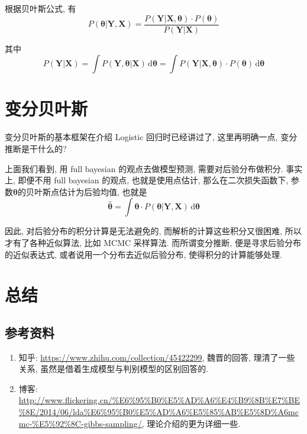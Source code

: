 \documentclass[a4paper,UTF8]{ctexart}
\theoremstyle{plain} \newtheorem{theorem}{定理}[section]
\theoremstyle{plain} \newtheorem{definition}{定义}[section]
\theoremstyle{plain} \newtheorem{lemma}{引理}[section]
\theoremstyle{plain} \newtheorem{proposition}{命题}[section]
\theoremstyle{plain} \newtheorem{example}{例}[section]
\theoremstyle{plain} \newtheorem{remark}{注}[section]
\theoremstyle{plain} \newtheorem{corollary}{推论}[section]
\newcommand\diff{\,{\mathrm d}} %
\begin{document}
根据贝叶斯公式, 有
\begin{equation}
P(\bm{\theta} | \bm{Y}, \bm{X}) = \frac{P(\bm{Y} | \bm{X}, \bm{\theta}) \cdot P(\bm{\theta})}{P(\bm{Y} | \bm{X})}
\end{equation}

 其中
 \begin{equation}
 P(\bm{Y} | \bm{X}) = \int P(\bm{Y}, \bm{\theta} | \bm{X}) \diff \bm{\theta} = \int P(\bm{Y} | \bm{X}, \bm{\theta}) \cdot P(\bm{\theta}) \diff \bm{\theta}
 \end{equation}
 


\section{变分贝叶斯}
变分贝叶斯的基本框架在介绍 Logistic 回归时已经讲过了, 这里再明确一点, 变分推断是干什么的?

上面我们看到, 用 full	bayesian 的观点去做模型预测, 需要对后验分布做积分. 事实上, 即便不用 full bayesian 的观点, 也就是使用点估计, 那么在二次损失函数下, 参数$\bm{\theta}$的贝叶斯点估计为后验均值, 也就是
\begin{equation}
\hat{\bm{\theta}} = \int \bm{\theta} \cdot P(\bm{\theta} | \bm{Y}, \bm{X}) \diff \bm{\theta}
\end{equation}

因此, 对后验分布的积分计算是无法避免的, 而解析的计算这些积分又很困难, 所以才有了各种近似算法, 比如 MCMC 采样算法. 而所谓变分推断, 便是寻求后验分布的近似表达式, 或者说用一个分布去近似后验分布, 使得积分的计算能够处理.








\section{总结}
\subsection{参考资料}
\begin{enumerate}[(1)]
\item 知乎: \url{https://www.zhihu.com/collection/45422299}, 魏晋的回答, 理清了一些关系, 虽然是借着生成模型与判别模型的区别回答的.

\item 博客: \url{http://www.flickering.cn/%E6%95%B0%E5%AD%A6%E4%B9%8B%E7%BE%8E/2014/06/lda%E6%95%B0%E5%AD%A6%E5%85%AB%E5%8D%A6mcmc-%E5%92%8C-gibbs-sampling/}, 理论介绍的更为详细一些.


\end{enumerate}
\end{document}
